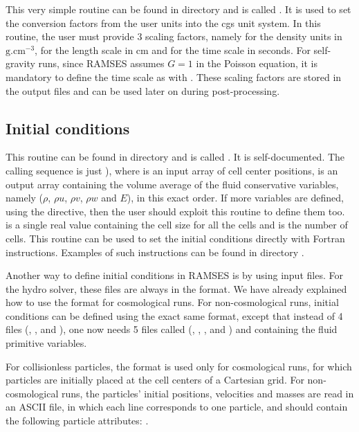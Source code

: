 This very simple routine can be found in directory  and is called
. It is used to set the conversion factors from the user units
into the cgs unit system. In this routine, the user must provide 3 scaling
factors, namely  for the density units in
$\mathrm{g}.\mathrm{cm}^{-3}$,  for the length scale in cm and
 for the time scale in seconds. For self-gravity runs, since
RAMSES assumes $G=1$ in the Poisson equation, it is mandatory to define the
time scale as  with . These
scaling factors are stored in the output files and can be used later on during
post-processing.

\subsection{Initial conditions}

This routine can be found in directory  and is called
. It is self-documented. The calling sequence is just
), where  is an input array of cell
center positions,  is an output array containing the volume average of
the fluid conservative variables, namely ($\rho$, $\rho u$, $\rho v$, $\rho w$
and $E$), in this exact order. If more variables are defined, using the
 directive, then the user should exploit this routine to
define them too.  is a single real value containing the cell size for
all the cells and  is the number of cells.  This routine can be used
to set the initial conditions directly with Fortran instructions. Examples of
such instructions can be found in directory .

Another way to define initial conditions in RAMSES is by using input files. For
the hydro solver, these files are always in the  format. We have
already explained how to use the  format for cosmological runs. For
non-cosmological runs, initial conditions can be defined using the exact same
format, except that instead of 4 files (, ,
 and ), one now needs 5 files called
(, , ,  and ) and
containing the fluid primitive variables.

For collisionless particles, the  format is used only for
cosmological runs, for which particles are initially placed at the cell centers
of a Cartesian grid. For non-cosmological runs, the particles' initial
positions, velocities and masses are read in an ASCII file, in which each line
corresponds to one particle, and should contain the following particle
attributes: .

